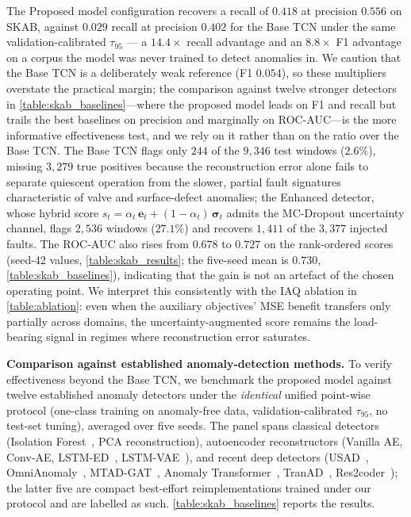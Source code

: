 The Proposed model configuration recovers a recall of $0.418$ at precision $0.556$ on SKAB, against $0.029$ recall at precision $0.402$ for the Base TCN under the same validation-calibrated $\tau_{95}$ --- a $14.4\times$ recall advantage and an $8.8\times$ F1 advantage on a corpus the model was never trained to detect anomalies in. We caution that the Base TCN is a deliberately weak reference (F1 $0.054$), so these multipliers overstate the practical margin; the comparison against twelve stronger detectors in \cref{table:skab_baselines}---where the proposed model leads on F1 and recall but trails the best baselines on precision and marginally on ROC-AUC---is the more informative effectiveness test, and we rely on it rather than on the ratio over the Base TCN. The Base TCN flags only $244$ of the $9{,}346$ test windows ($2.6\%$), missing $3{,}279$ true positives because the reconstruction error alone fails to separate quiescent operation from the slower, partial fault signatures characteristic of valve and surface-defect anomalies; the Enhanced detector, whose hybrid score $s_t = \alpha_t\,\mathbf{e}_t + (1-\alpha_t)\,\boldsymbol{\sigma}_t$ admits the MC-Dropout uncertainty channel, flags $2{,}536$ windows ($27.1\%$) and recovers $1{,}411$ of the $3{,}377$ injected faults. The ROC-AUC also rises from $0.678$ to $0.727$ on the rank-ordered scores (seed-42 values, \cref{table:skab_results}; the five-seed mean is $0.730$, \cref{table:skab_baselines}), indicating that the gain is not an artefact of the chosen operating point. We interpret this consistently with the IAQ ablation in \cref{table:ablation}: even when the auxiliary objectives' MSE benefit transfers only partially across domains, the uncertainty-augmented score remains the load-bearing signal in regimes where reconstruction error saturates.

\textbf{Comparison against established anomaly-detection methods.} To verify effectiveness beyond the Base TCN, we benchmark the proposed model against twelve established anomaly detectors under the \emph{identical} unified point-wise protocol (one-class training on anomaly-free data, validation-calibrated $\tau_{95}$, no test-set tuning), averaged over five seeds. The panel spans classical detectors (Isolation Forest~\cite{liu2008isolation}, PCA reconstruction), autoencoder reconstructors (Vanilla AE, Conv-AE, LSTM-ED~\cite{malhotra2016lstmed}, LSTM-VAE~\cite{park2018lstmvae}), and recent deep detectors (USAD~\cite{audibert2020usad}, OmniAnomaly~\cite{su2019robust}, MTAD-GAT~\cite{zhao2020mtadgat}, Anomaly Transformer~\cite{xu2022anomalytransformer}, TranAD~\cite{tuli2022tranad}, Res2coder~\cite{wang2025res2coder}); the latter five are compact best-effort reimplementations trained under our protocol and are labelled as such. \cref{table:skab_baselines} reports the results.

